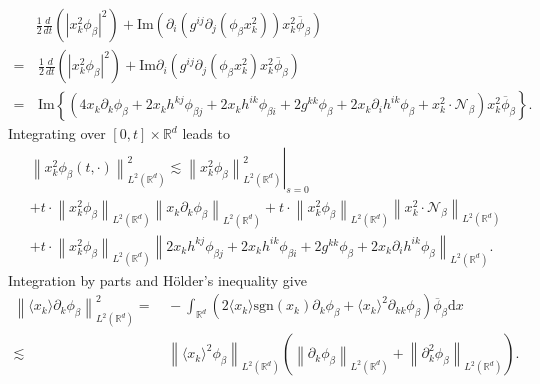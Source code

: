\documentclass[10pt,twoside,a4paper]{article}
\numberwithin{equation}{section}\allowdisplaybreaks
\begin{document}
\begin{align*}   
	&\frac 12\frac{d}{d t}\left(  \left| x_k^2\phi_{\beta} \right|^2 \right)+ \mathrm{Im} \left(\partial_i\left( g^{ij} \partial_j\left(\phi_{\beta }x^2_k\right)\right)x_k^2\overline{\phi}_{\beta}\right)	 \\
	=&\, \frac 12\frac{d}{d t}\left(  \left| x_k^2\phi_{\beta} \right|^2 \right)+ \mathrm{Im}  \partial_i\left( g^{ij} \partial_j\left(\phi_{\beta }x^2_k\right) x_k^2\overline{\phi}_{\beta}\right)	\nonumber\\
	=&\,\mathrm{Im} \left\{  \left(4 x_k \partial_k  \phi_\beta +2 x_k h^{kj} \phi_{\beta j}+2 x_k h^{ik} \phi_{\beta i}+2 g^{kk} \phi_{\beta } +2 x_k \partial_i h^{ik} \phi_{\beta } +x^2_k \cdot\mathcal{N}_\beta  \right) x_k^2\overline{\phi}_{\beta}\right\}.\nonumber
\end{align*}	
Integrating over $ [0,t]\times \mathbb{R}^d $ leads to
\begin{align} \label{qenxc2}
		&\left\|  x_k^2 \phi_{\beta}\left(t,\cdot\right)\right\|_{L^2(\mathbb{R}^d)}^2  \lesssim\left. \left\|  x_k^2 \phi_{\beta}\right\|_{L^2(\mathbb{R}^d)}^2 \right|_{s=0}\\ 
		&+  t\cdot\left\|  x_k^2 \phi_{\beta}\right\|_{L^2(\mathbb{R}^d)}  \left\|  x_k \partial_k  \phi_{\beta}\right\|_{L^2(\mathbb{R}^d)}+t\cdot\left\|  x_k^2 \phi_{\beta}\right\|_{L^2(\mathbb{R}^d)}  \left\|   x^2_k \cdot\mathcal{N}_\beta    \right\|_{L^2(\mathbb{R}^d)} \nonumber\\
	&+t\cdot\left\|  x_k^2 \phi_{\beta}\right\|_{L^2(\mathbb{R}^d)} \left\|   2 x_k h^{kj} \phi_{\beta j}+2 x_k h^{ik} \phi_{\beta i}+2 g^{kk} \phi_{\beta } +2 x_k \partial_i h^{ik} \phi_{\beta }   \right\|_{L^2(\mathbb{R}^d)}. \nonumber 
\end{align}
Integration by parts and H\"older's inequality give
\begin{align}\label{qenxc20}
	\left\| \langle x_k\rangle \partial_k  \phi_{\beta}\right\|_{L^2(\mathbb{R}^d)}^2
	=&\,- \int_{\mathbb{R}^{d}} \left(2  \langle x_k\rangle   \mathrm{sgn}(x_k) \partial_k  \phi_{\beta} +\langle x_k\rangle^{2 } \partial_{kk } \phi_{\beta} \right) \overline{\phi}_\beta\mathrm{d} x\\
	\lesssim &\, \left\|  \langle x_k\rangle^{2 }  \phi_{\beta}\right\|_{L^2(\mathbb{R}^d)} \left( \left\|  \partial_k  \phi_{\beta}\right\|_{L^2(\mathbb{R}^d)} +\left\|  \partial_k^2  \phi_{\beta}\right\|_{L^2(\mathbb{R}^d)} \right).\nonumber
\end{align}
\end{document}
